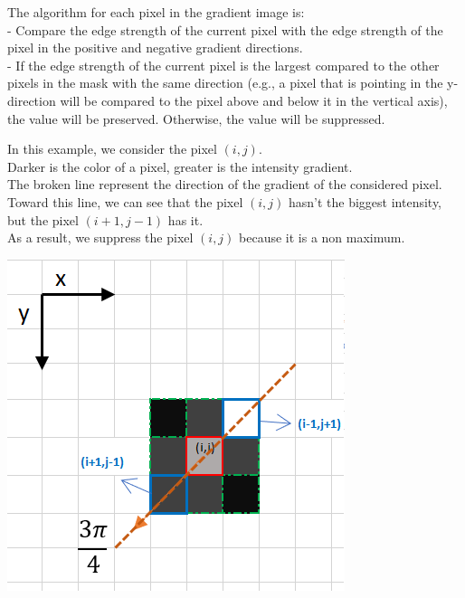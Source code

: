 \documentclass{article}
\begin{document}
The algorithm for each pixel in the gradient image is:\\
- Compare the edge strength of the current pixel with the edge strength of the pixel in the positive and negative gradient directions.\\
- If the edge strength of the current pixel is the largest compared to the other pixels in the mask with the same direction (e.g., a pixel that is pointing in the y-direction will be compared to the pixel above and below it in the vertical axis), the value will be preserved. Otherwise, the value will be suppressed.
\vspace{1 cm}


\begin{minipage}{.6\textwidth}%
In this example, we consider the pixel $(i, j)$.\\
Darker is the color of a pixel, greater is the intensity gradient.\\
The broken line represent the direction of the gradient of the considered pixel.\\
Toward this line, we can see that the pixel $(i, j)$ hasn't the biggest intensity, but the pixel $(i+1, j-1)$ has it.\\
As a result, we suppress the pixel $(i, j)$ because it is a non maximum.
\end{minipage}%
\hfill
\begin{minipage}{.35\textwidth}%
\includegraphics[width=\textwidth]{images/img7.png}
\end{minipage}%
\end{document}
